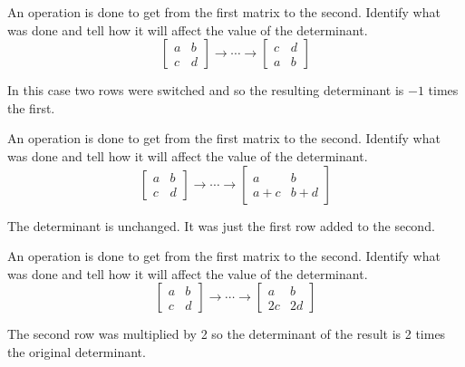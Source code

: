 \documentclass{ximera}
\begin{document}
\begin{problem}\label{prb:7.10} An operation is done to get from the first matrix to the second.
Identify what was done and tell how it will affect the value of the
determinant.
\begin{equation*}
\left[
\begin{array}{cc}
a & b \\
c & d
\end{array}
\right] \rightarrow \cdots \rightarrow \left[
\begin{array}{cc}
c & d \\
a & b
\end{array}
\right]
\end{equation*}
\begin{hint}
In this case two rows were switched and so the resulting determinant is $-1$
times the first.
\end{hint}
\end{problem}


\begin{problem}\label{prb:7.11} An operation is done to get from the first matrix to the second.
Identify what was done and tell how it will affect the value of the
determinant.
\begin{equation*}
\left[
\begin{array}{cc}
a & b \\
c & d
\end{array}
\right] \rightarrow \cdots \rightarrow \left[
\begin{array}{cc}
a & b \\
a+c & b+d
\end{array}
\right]
\end{equation*}
\begin{hint}
The determinant is unchanged. It was just the first row added to the second.
\end{hint}
\end{problem}


\begin{problem}\label{prb:7.12} An operation is done to get from the first matrix to the second.
Identify what was done and tell how it will affect the value of the
determinant.
\begin{equation*}
\left[
\begin{array}{cc}
a & b \\
c & d
\end{array}
\right] \rightarrow \cdots \rightarrow \left[
\begin{array}{cc}
a & b \\
2c & 2d
\end{array}
\right]
\end{equation*}
\begin{hint}
The second row was multiplied by 2 so the determinant of the result is 2
times the original determinant.
\end{hint}
\end{problem}
\end{document}
